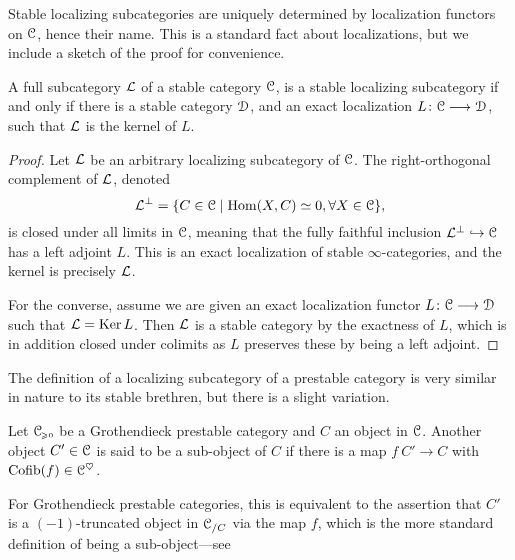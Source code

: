 Stable localizing subcategories are uniquely determined by localization functors on $\EuScript{C}$, hence their name. This is a standard fact about localizations, but we include a sketch of the proof for convenience. 

\begin{lemma}
    A full subcategory $\mathcal{L}$ of a stable category $\EuScript{C}$, is a stable localizing subcategory if and only if there is a stable category $\EuScript{D}$, and an exact localization $L\colon\EuScript{C}\longrightarrow\EuScript{D}$, such that $\mathcal{L}$ is the kernel of $L$. 
\end{lemma}
\begin{proof}
    Let $\mathcal{L}$ be an arbitrary localizing subcategory of $\EuScript{C}$. The right-orthogonal complement of $\mathcal{L}$, denoted
    \[\mathcal{L}^\perp = \{C\in \EuScript{C} \mid \operatorname{Hom}(X, C)\simeq 0, \forall X\in \EuScript{C}\},\]
    is closed under all limits in $\EuScript{C}$, meaning that the fully faithful inclusion $\mathcal{L}^\perp \hookrightarrow \EuScript{C}$ has a left adjoint $L$. This is an exact localization of stable $\infty$-categories, and the kernel is precisely $\mathcal{L}$. 
    
    For the converse, assume we are given an exact localization functor $L\colon \EuScript{C}\longrightarrow \EuScript{D}$ such that $\mathcal{L} = \operatorname{Ker} L$. Then $\mathcal{L}$ is a stable category by the exactness of $L$, which is in addition closed under colimits as $L$ preserves these by being a left adjoint. 
\end{proof}


The definition of a localizing subcategory of a prestable category is very similar in nature to its stable brethren, but there is a slight variation. 

\begin{definition}
    Let $\EuScript{C}_{\hspace{-1pt}\scriptscriptstyle\geqslant 0}$ be a Grothendieck prestable category and $C$ an object in $\EuScript{C}$. Another object $C'\in \EuScript{C}$ is said to be a sub-object of $C$ if there is a map $f\: C'\to C$ with $ \operatorname{Cofib}(f)\in \EuScript{C}^\heartsuit$. 
\end{definition}

\begin{remark}
    For Grothendieck prestable categories, this is equivalent to the assertion that $C'$ is a $(-1)$-truncated object in $\EuScript{C}_{/C}$ via the map $f$, which is the more standard definition of being a sub-object---see \cite[C.2.3.4]{lurie_SAG}
\end{remark}

